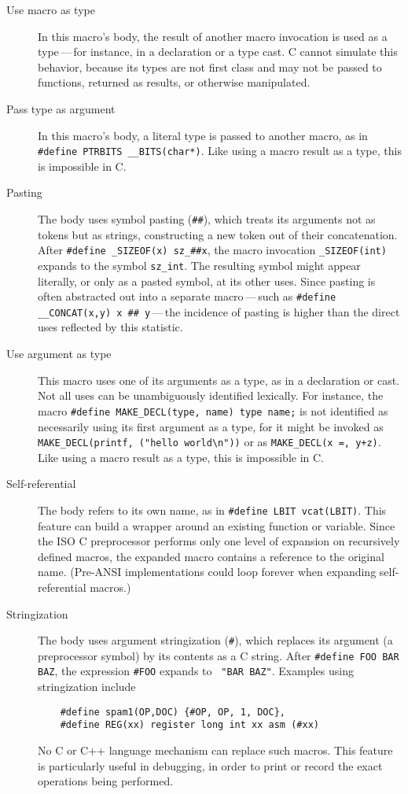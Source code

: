 \documentclass[10pt]{article}
\begin{document}
\begin{description}
\item[Use macro as type]
  In this macro's body, the result of another macro invocation is used as a
  type\,---\,for instance, in a declaration or a type cast.  C cannot
  simulate this behavior, because its types are not first class and may not
  be passed to functions, returned as results, or otherwise manipulated.

\item[Pass type as argument]
  In this macro's body, a literal type is passed to another macro, as in
  {\tt \#define PTRBITS \verb|__BITS|(char*)}.  Like using a macro result
  as a type, this is impossible in C\@.

\item[Pasting]\label{def:pasting}
  The body uses symbol pasting ({\tt \#\#}), which treats its arguments not
  as tokens but as strings, constructing a new token out of their
  concatenation.  After {\tt \#define \verb|_SIZEOF|(x) \verb|sz_|\#\#x},
  the macro invocation {\tt \verb|_SIZEOF|(int)} expands to the 
  symbol {\tt \verb|sz_int|}.  The resulting symbol might appear literally, or
  only as a pasted symbol, at its other uses.  Since pasting is often
  abstracted out into a separate macro\,---\,such as {\tt \#define
  \verb|__CONCAT|(x,y) x \#\# y}\,---\,the incidence of pasting is higher
  than the direct uses reflected by this statistic.

\item[Use argument as type]
  This macro uses one of its arguments as a type, as in a declaration or
  cast.  Not all uses can be unambiguously identified lexically.  For
  instance, the macro {\tt \#define \verb|MAKE_DECL|(type, name) type
  name;} is not identified as necessarily using its first argument as a
type, for it might be invoked as {\tt \verb|MAKE_DECL|(printf, ("hello
world\verb|\|n"))} or as {\tt \verb|MAKE_DECL|(x =, y+z)}.  Like using a
macro result as a type, this is impossible in C\@.

\item[Self-referential]
  The body refers to its own name, as in {\tt \#define LBIT vcat(LBIT)}.
  This feature can build a wrapper around an existing function or variable.
  Since the ISO C preprocessor performs only one level of expansion on
  recursively defined macros, the expanded macro contains a reference to
  the original name.  (Pre-ANSI implementations could loop forever when
  expanding self-referential macros.)

\item[Stringization]
  The body uses argument stringization ({\tt \#}), which replaces its
  argument (a preprocessor symbol) by its contents as a C string.  After
  {\tt \#define FOO BAR BAZ}, the expression {\tt \#FOO} expands to {\tt
  "BAR~BAZ"}.  Examples using stringization include
\begin{verbatim}
    #define spam1(OP,DOC) {#OP, OP, 1, DOC},
    #define REG(xx) register long int xx asm (#xx)
\end{verbatim}
  No C or C++ language mechanism can replace such macros.  This feature is
  particularly useful in debugging, in order to print or record the exact
  operations being performed.


\end{description}
\end{document}
